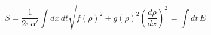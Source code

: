 \begin{equation}
S = \frac{1}{2 \pi \alpha'} \int dx\,dt \sqrt{f(\rho)^2 + g(\rho)^2
(\frac{d\rho}{dx})^2} = \int dt\, E
\end{equation}

